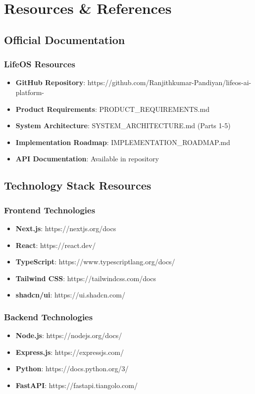 \chapter{Resources \& References}
\label{appendix:resources}

\section{Official Documentation}

\subsection{LifeOS Resources}
\begin{itemize}
    \item \textbf{GitHub Repository}: https://github.com/Ranjithkumar-Pandiyan/lifeos-ai-platform-
    \item \textbf{Product Requirements}: PRODUCT\_REQUIREMENTS.md
    \item \textbf{System Architecture}: SYSTEM\_ARCHITECTURE.md (Parts 1-5)
    \item \textbf{Implementation Roadmap}: IMPLEMENTATION\_ROADMAP.md
    \item \textbf{API Documentation}: Available in repository
\end{itemize}

\section{Technology Stack Resources}

\subsection{Frontend Technologies}
\begin{itemize}
    \item \textbf{Next.js}: https://nextjs.org/docs
    \item \textbf{React}: https://react.dev/
    \item \textbf{TypeScript}: https://www.typescriptlang.org/docs/
    \item \textbf{Tailwind CSS}: https://tailwindcss.com/docs
    \item \textbf{shadcn/ui}: https://ui.shadcn.com/
\end{itemize}

\subsection{Backend Technologies}
\begin{itemize}
    \item \textbf{Node.js}: https://nodejs.org/docs/
    \item \textbf{Express.js}: https://expressjs.com/
    \item \textbf{Python}: https://docs.python.org/3/
    \item \textbf{FastAPI}: https://fastapi.tiangolo.com/
\end{itemize}


